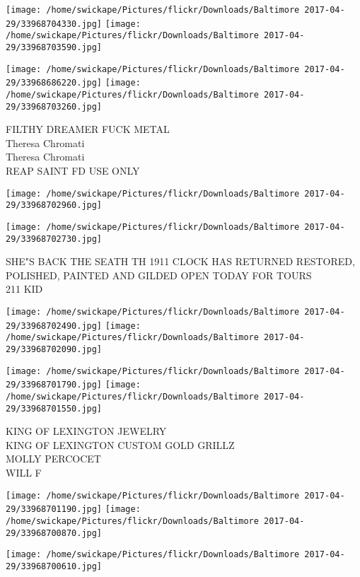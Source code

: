 \documentclass[10pt,letterpaper]{article}
\begin{document}
\texttt{[image: /home/swickape/Pictures/flickr/Downloads/Baltimore 2017-04-29/33968704330.jpg]}
\texttt{[image: /home/swickape/Pictures/flickr/Downloads/Baltimore 2017-04-29/33968703590.jpg]}

\texttt{[image: /home/swickape/Pictures/flickr/Downloads/Baltimore 2017-04-29/33968686220.jpg]}
\texttt{[image: /home/swickape/Pictures/flickr/Downloads/Baltimore 2017-04-29/33968703260.jpg]}

FILTHY DREAMER FUCK METAL\\
Theresa Chromati\\
Theresa Chromati\\
REAP SAINT FD USE ONLY\\
\pagebreak

\texttt{[image: /home/swickape/Pictures/flickr/Downloads/Baltimore 2017-04-29/33968702960.jpg]}

\vspace{0.25in}
\texttt{[image: /home/swickape/Pictures/flickr/Downloads/Baltimore 2017-04-29/33968702730.jpg]}

SHE"S BACK THE SEATH TH 1911 CLOCK HAS RETURNED RESTORED, POLISHED, PAINTED AND GILDED OPEN TODAY FOR TOURS\\
211 KID\\
\pagebreak

\texttt{[image: /home/swickape/Pictures/flickr/Downloads/Baltimore 2017-04-29/33968702490.jpg]}
\texttt{[image: /home/swickape/Pictures/flickr/Downloads/Baltimore 2017-04-29/33968702090.jpg]}

\texttt{[image: /home/swickape/Pictures/flickr/Downloads/Baltimore 2017-04-29/33968701790.jpg]}
\texttt{[image: /home/swickape/Pictures/flickr/Downloads/Baltimore 2017-04-29/33968701550.jpg]}

KING OF LEXINGTON JEWELRY\\
KING OF LEXINGTON CUSTOM GOLD GRILLZ\\
MOLLY PERCOCET\\
WILL F\\
\pagebreak

\texttt{[image: /home/swickape/Pictures/flickr/Downloads/Baltimore 2017-04-29/33968701190.jpg]}
\texttt{[image: /home/swickape/Pictures/flickr/Downloads/Baltimore 2017-04-29/33968700870.jpg]}

\vspace{0.25in}
\texttt{[image: /home/swickape/Pictures/flickr/Downloads/Baltimore 2017-04-29/33968700610.jpg]}
\end{document}
